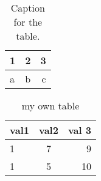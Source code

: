 \documentclass{article}
\begin{document}
\begin{table}[h!]
  \begin{center}
    \caption{Caption for the table.}
    \label{tab:table1}
    \begin{tabular}{|l|c|r|}
	\hline
      1 & 2 & 3\\
      \hline
      a & b & c\\
	\hline
    \end{tabular}
  \end{center}
\end{table}

\begin{table}[h!]
  \begin{center}
      \caption{my own table}
       \label{tab:table2}
	\begin{tabular}{|l|c|r|}
	   \hline
	val1 & val2 & val 3 \\
	\hline
	1 & 7 & 9 \\
	1 & 5 & 10 \\
	\hline
	\end{tabular}
	\end{center}
	\end{table}
	

\newpage
\listoftables
\end{document}
